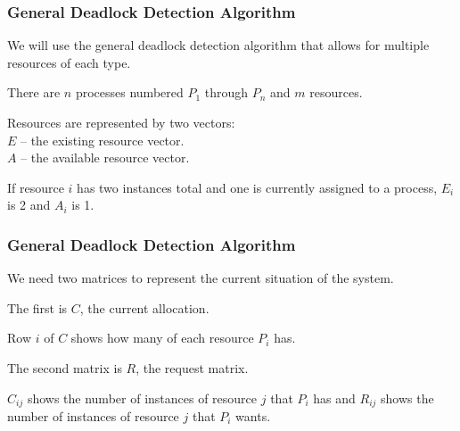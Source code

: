 \begin{frame}
	\frametitle{General Deadlock Detection Algorithm}

	We will use the general deadlock detection algorithm that allows for multiple resources of each type.

	There are $n$ processes numbered $P_{1}$ through $P_{n}$ and $m$ resources.

	Resources are represented by two vectors:\\
	\quad $E$ -- the existing resource vector.\\
	\quad $A$ -- the available resource vector.

	If resource $i$ has two instances total and one is currently assigned to a process, $E_{i}$ is 2 and $A_{i}$ is 1.

\end{frame}

\begin{frame}
	\frametitle{General Deadlock Detection Algorithm}

	We need two matrices to represent the current situation of the system.

	The first is $C$, the current allocation.

	Row $i$ of $C$ shows how many of each resource $P_{i}$ has.

	The second matrix is $R$, the request matrix.

	$C_{ij}$ shows the number of instances of resource $j$ that $P_{i}$ has and $R_{ij}$ shows the number of instances of resource $j$ that $P_{i}$ wants.

\end{frame}

